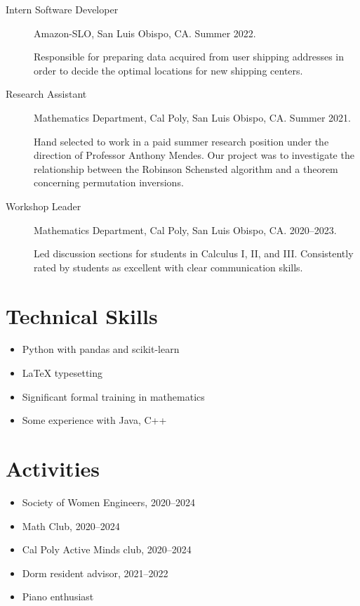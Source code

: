 \documentclass{article}
\begin{document}
\begin{description}
\item[Intern Software Developer]

  Amazon-SLO, San Luis Obispo, CA.  Summer 2022.

  Responsible for preparing data acquired from user shipping addresses in order
  to decide the optimal locations for new shipping centers.

\item[Research Assistant]

  Mathematics Department, Cal Poly, San Luis Obispo, CA.  Summer 2021.

  Hand selected to work in a paid summer research position under the direction
  of Professor Anthony Mendes.  Our project was to investigate the relationship
  between the Robinson Schensted algorithm and a theorem concerning permutation
  inversions.

\item[Workshop Leader]

  Mathematics Department, Cal Poly, San Luis Obispo, CA.  2020--2023.

  Led discussion sections for students in Calculus I, II, and III.  Consistently
  rated by students as excellent with clear communication skills.
\end{description}

\section*{Technical Skills}
\begin{itemize}
\item Python with pandas and scikit-learn
\item \LaTeX{} typesetting
\item Significant formal training in mathematics
\item Some experience with Java, C++
\end{itemize}

\section*{Activities}
\begin{itemize}
\item Society of Women Engineers, 2020--2024
\item Math Club, 2020--2024
\item Cal Poly Active Minds club, 2020--2024
\item Dorm resident advisor, 2021--2022
\item Piano enthusiast
\end{itemize}
\end{document}
